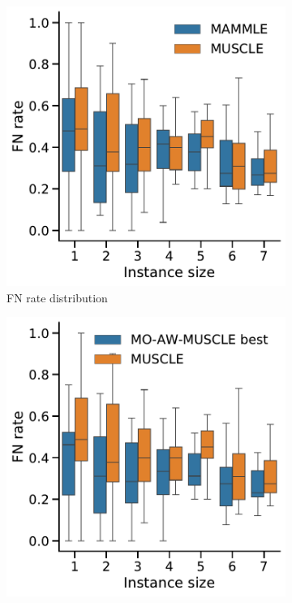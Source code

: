 \begin{figure}[!htbp]%
	\begin{adjustwidth}{-1.2cm}{}
		\centering
		\begin{subfigure}{0.40\textwidth} \includegraphics[width=\textwidth]{Figure/comparison-ml} \caption{FN rate distribution} \label{fig:boxplot-ml} \end{subfigure}
		\begin{subfigure}{0.40\textwidth} \includegraphics[width=\textwidth]{Figure/comparison-momuscle} 

\end{subfigure}
\end{adjustwidth}
\end{figure}
